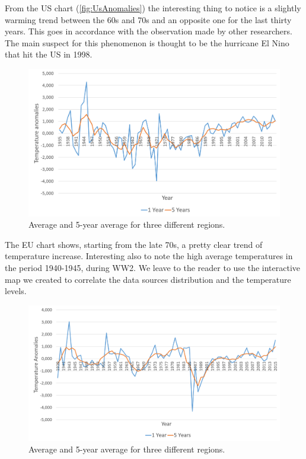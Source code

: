 \documentclass{vldb}
\begin{document}
From the US chart (\ref{fig:UsAnomalies}) the interesting thing to notice is a slightly warming trend between the 60s and 70s and an opposite one for the last thirty years. This goes in accordance with the observation made by other researchers\cite{hansen2006global}. The main suspect for this phenomenon is thought to be the hurricane El Nino that hit the US in 1998.

\begin{figure}[tbh]
\includegraphics[width=1\linewidth]{EuAnomalies}
\caption{Average and 5-year average for three different regions.}
\label{fig:EuAnomalies}
\end{figure}

The EU chart shows, starting from the late 70s, a pretty clear trend of temperature increase. Interesting also to note the high average temperatures in the period 1940-1945, during WW2. We leave to the reader to use the interactive map we created to correlate the data sources distribution and the temperature levels.

\begin{figure}[tbh]
\includegraphics[width=1\linewidth]{AuAnomalies}
\caption{Average and 5-year average for three different regions.}
\label{fig:AuAnomalies}
\end{figure}
\end{document}
